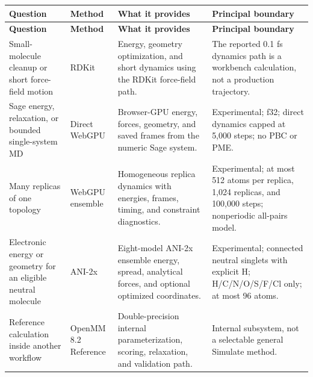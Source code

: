 \begingroup
\footnotesize
\begin{longtable}{@{}p{1.31in}p{0.78in}p{1.77in}p{1.85in}@{}}
\toprule
\textbf{Question} & \textbf{Method} & \textbf{What it provides} & \textbf{Principal boundary}\\
\midrule
\endfirsthead
\toprule
\textbf{Question} & \textbf{Method} & \textbf{What it provides} & \textbf{Principal boundary}\\
\midrule
\endhead
Small-molecule cleanup or short force-field motion & RDKit & Energy, geometry optimization, and short dynamics using the RDKit force-field path. & The reported 0.1 fs dynamics path is a workbench calculation, not a production trajectory.\\
Sage energy, relaxation, or bounded single-system MD & Direct WebGPU & Browser-GPU energy, forces, geometry, and saved frames from the numeric Sage system. & Experimental; f32; direct dynamics capped at 5,000 steps; no PBC or PME.\\
Many replicas of one topology & WebGPU ensemble & Homogeneous replica dynamics with energies, frames, timing, and constraint diagnostics. & Experimental; at most 512 atoms per replica, 1,024 replicas, and 100,000 steps; nonperiodic all-pairs model.\\
Electronic energy or geometry for an eligible neutral molecule & ANI-2x & Eight-model ANI-2x ensemble energy, spread, analytical forces, and optional optimized coordinates. & Experimental; connected neutral singlets with explicit H; H/C/N/O/S/F/Cl only; at most 96 atoms.\\
Reference calculation inside another workflow & OpenMM 8.2 Reference & Double-precision internal parameterization, scoring, relaxation, and validation path. & Internal subsystem, not a selectable general Simulate method.\\
\bottomrule
\end{longtable}
\endgroup


